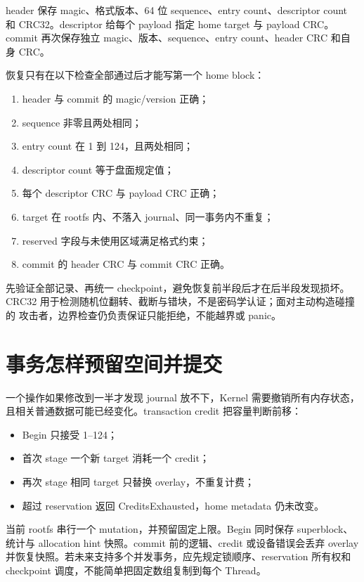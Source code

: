 header 保存 magic、格式版本、64 位 sequence、entry count、descriptor count
和 CRC32。descriptor 给每个 payload 指定 home target 与 payload CRC。commit
再次保存独立 magic、版本、sequence、entry count、header CRC 和自身 CRC。

恢复只有在以下检查全部通过后才能写第一个 home block：

\begin{enumerate}
  \item header 与 commit 的 magic/version 正确；
  \item sequence 非零且两处相同；
  \item entry count 在 1 到 124，且两处相同；
  \item descriptor count 等于盘面规定值；
  \item 每个 descriptor CRC 与 payload CRC 正确；
  \item target 在 rootfs 内、不落入 journal、同一事务内不重复；
  \item reserved 字段与未使用区域满足格式约束；
  \item commit 的 header CRC 与 commit CRC 正确。
\end{enumerate}

先验证全部记录、再统一 checkpoint，避免恢复前半段后才在后半段发现损坏。
CRC32 用于检测随机位翻转、截断与错块，不是密码学认证；面对主动构造碰撞的
攻击者，边界检查仍负责保证只能拒绝，不能越界或 panic。

\section{事务怎样预留空间并提交}
一个操作如果修改到一半才发现 journal 放不下，Kernel 需要撤销所有内存状态，
且相关普通数据可能已经变化。transaction credit 把容量判断前移：

\begin{itemize}
  \item Begin 只接受 1--124；
  \item 首次 stage 一个新 target 消耗一个 credit；
  \item 再次 stage 相同 target 只替换 overlay，不重复计费；
  \item 超过 reservation 返回 CreditsExhausted，home metadata 仍未改变。
\end{itemize}

当前 rootfs 串行一个 mutation，并预留固定上限。Begin 同时保存 superblock、
统计与 allocation hint 快照。commit 前的逻辑、credit 或设备错误会丢弃
overlay 并恢复快照。若未来支持多个并发事务，应先规定锁顺序、reservation
所有权和 checkpoint 调度，不能简单把固定数组复制到每个 Thread。

